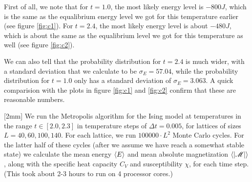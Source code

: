 \documentclass[12pt,a4paper]{article}
\newcommand\M[1]{\begin{bmatrix} #1 \end{bmatrix}} %
\def\M{\mathscr{M}}
\newcommand\oppg[1]{\reversemarginnote{\textcolor{black!40}{#1)}}[2mm]}
\begin{document}
First of all, we note that for $t = 1.0$, the most likely energy level is $-800J$, which is the same as the equalibrium energy level we got for this temperature earlier (see figure \ref{fig:c1}). For $t = 2.4$, the most likely energy level is about $-480J$, which is about the same as the equalibrium level we got for this temperature as well (see figure \ref{fig:c2}).

We can also tell that the probability distribution for $t = 2.4$ is much wider, with a standard deviation that we calculate to be $\sigma_E = 57.04$, while the probability distribution for $t = 1.0$ only has a standard deviation of $\sigma_E = 3.063$. A quick comparision with the plots in figure \ref{fig:c1} and \ref{fig:c2} confirm that these are reasonable numbers.

\begin{figure}[!ht]
  \centering

   \label{fig:d}
\end{figure}

\oppg{e}
We run the Metropolis algorithm for the Ising model at temperatures in the range $t \in [2.0,2.3]$ in temperature steps of $\Delta{t} = 0.005$, for lattices of sizes $L = 40, 60, 100, 140$. For each lattice, we run $\num{100000} \cdot L^2$ Monte Carlo cycles. For the latter half of these cycles (after we assume we have reach a somewhat stable state) we calculate the mean energy $\expval{E}$ and mean absolute magnetization $\expval{|\M|}$, along with the specific heat capacity $C_V$ and susceptibility $\chi$, for each time step. (This took about 2-3 hours to run on 4 processor cores.)
\end{document}
